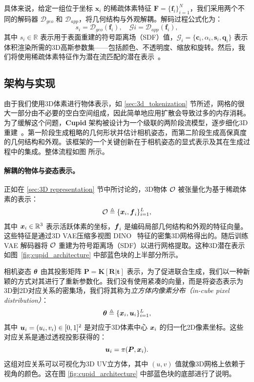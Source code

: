 \documentclass[../../book-main_zh.tex]{subfiles}
\begin{document}
具体来说，给定一组位于坐标 $\boldsymbol{x}_i$ 的稀疏体素特征 $\boldsymbol{F} = \{\boldsymbol{f}_i\}_{i=1}^N$，我们采用两个不同的解码器 $\mathcal{D}_{geo}$ 和 $\mathcal{D}_{app}$，将几何结构与外观解耦。解码过程公式化为：
\begin{equation}
s_i = \mathcal{D}_{geo}(\boldsymbol{f}_i), \quad \mathcal{G}i = \mathcal{D}_{app}(\boldsymbol{f}_i),
\end{equation}
其中 $s_i \in \mathbb{R}$ 表示用于表面重建的符号距离场（SDF）值，$\mathcal{G}_i = \{\boldsymbol{c}_i, \alpha_i, \boldsymbol{s}_i, \boldsymbol{q}_i\}$ 表示体积渲染所需的3D高斯参数集——包括颜色、不透明度、缩放和旋转。然后，我们将使用稀疏体素特征作为潜在流匹配的潜在表示~\citep{rombach2022high}。

\subsection{架构与实现}
\label{sub:3d_reconstruction_architecture}
由于我们使用3D体素进行物体表示，如 \ref{sec:3d_tokenization} 节所述，网格的很大一部分由不必要的空白空间组成，因此简单地应用扩散会导致过多的内存消耗。为了缓解这个问题，\textbf{Cupid} 架构被设计为一个级联的两阶段流模型，逐步细化3D重建~\citep{xiang2025structured}。第一阶段生成粗略的几何形状并估计相机姿态，而第二阶段生成高保真度的几何结构和外观。该框架的一个关键创新在于相机姿态的显式表示及其在生成过程中的集成。整体流程如图  所示。

\paragraph{解耦的物体与姿态表示。}

正如在 \ref{sec:3D representation} 节中所讨论的，3D物体 $\mathcal{O}$ 被张量化为基于稀疏体素的表示：
\begin{equation}
    \mathcal{O} \triangleq \{\boldsymbol{x}_i, \boldsymbol{f}_i\}_{i=1}^{L},
\end{equation}
其中 $\boldsymbol{x}_i \in \mathbb{R}^3$ 表示活跃体素的坐标，$\boldsymbol{f}_i$ 是编码局部几何结构和外观的特征向量。这些特征是通过3D VAE压缩多视图 DINO~\citep{oquab2023dinov2} 特征的密集3D网格得出的。随后训练 VAE 解码器将 $\mathcal{O}$ 重建为符号距离场（SDF）以进行网格提取。这种3D潜在表示如图~\ref{fig:cupid_architecture} 中部蓝色块的上半部分所示。

相机姿态 $\boldsymbol{\theta}$ 由其投影矩阵
$\boldsymbol{P} = \boldsymbol{K}[\boldsymbol{R}|\boldsymbol{t}]$ 表示，为了促进联合生成，我们以一种新颖的方式对其进行了重新参数化。我们没有使用紧凑的向量，而是将姿态表示为3D到2D对应关系的密集场，我们将其称为\textit{立方体内像素分布（in-cube pixel distribution）}：
\[
\boldsymbol{\theta} \triangleq \{\boldsymbol{x}_i, \boldsymbol{u}_i\}_{i=1}^{L},
\]
其中 $\boldsymbol{u}_i = (u_i, v_i) \in [0,1]^2$ 是对应于3D体素中心 $\boldsymbol{x}_i$ 的归一化2D像素坐标。这些对应关系是通过透视投影获得的：
\[
\boldsymbol{u}_i = \pi(\boldsymbol{P}, \boldsymbol{x}_i).
\]
这组对应关系可以可视化为3D UV立方体，其中 $(u,v)$ 值就像3D网格上依赖于视角的颜色。这在图 \ref{fig:cupid_architecture} 中部蓝色块的底部进行了说明。
\end{document}
